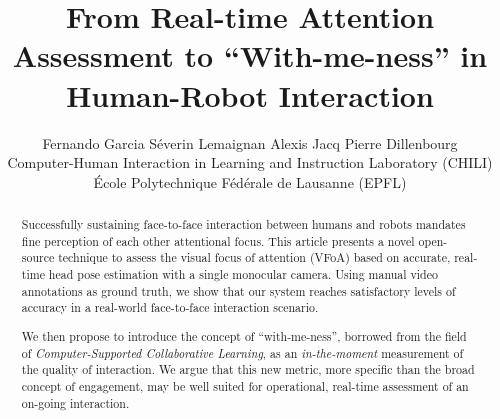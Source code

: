 \documentclass{sig-alternate}
\begin{document}
%

\title{From Real-time Attention Assessment to ``With-me-ness'' in Human-Robot Interaction}
\author{Fernando Garcia \qquad Séverin Lemaignan \qquad Alexis Jacq \qquad Pierre Dillenbourg\\Computer-Human Interaction in Learning and Instruction Laboratory (CHILI)\\École Polytechnique Fédérale de Lausanne (EPFL)}


\maketitle
\begin{abstract}

Successfully sustaining face-to-face interaction between humans and robots
mandates fine perception of each other attentional focus. This article presents
a novel open-source technique to assess the visual focus of attention (VFoA)
based on accurate, real-time head pose estimation with a single monocular
camera.  Using manual video annotations as ground truth, we show that our system
reaches satisfactory levels of accuracy in a real-world face-to-face interaction
scenario.

We then propose to introduce the concept of ``with-me-ness'', borrowed from the
field of {\it Computer-Supported Collaborative Learning}, as an
\emph{in-the-moment} measurement of the quality of interaction. We argue that
this new metric, more specific than the broad concept of engagement, may be well
suited for operational, real-time assessment of an on-going interaction.

\end{abstract}



\end{document}
